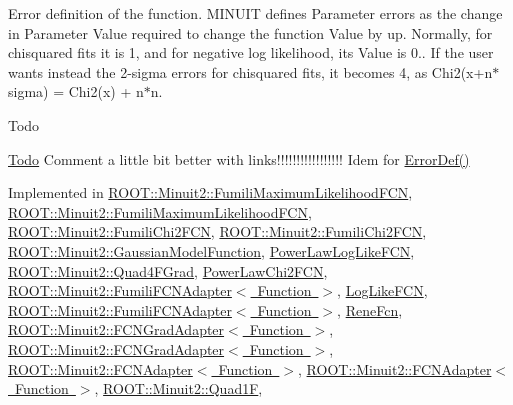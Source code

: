 Error definition of the function. M\+I\+N\+U\+IT defines Parameter errors as the change in Parameter Value required to change the function Value by up. Normally, for chisquared fits it is 1, and for negative log likelihood, its Value is 0.. If the user wants instead the 2-\/sigma errors for chisquared fits, it becomes 4, as Chi2(x+n$\ast$sigma) = Chi2(x) + n$\ast$n.

\begin{DoxyRefDesc}{Todo}
\item[\mbox{\hyperlink{todo__todo000013}{Todo}}]Comment a little bit better with links!!!!!!!!!!!!!!!!! Idem for \mbox{\hyperlink{classROOT_1_1Minuit2_1_1FCNBase_ac4592475c58a65b037ba97ab5f3cba10}{Error\+Def()}}\end{DoxyRefDesc}


Implemented in \mbox{\hyperlink{classROOT_1_1Minuit2_1_1FumiliMaximumLikelihoodFCN_ab945da701895bfba143da08f76ba2d05}{R\+O\+O\+T\+::\+Minuit2\+::\+Fumili\+Maximum\+Likelihood\+F\+CN}}, \mbox{\hyperlink{classROOT_1_1Minuit2_1_1FumiliMaximumLikelihoodFCN_ab945da701895bfba143da08f76ba2d05}{R\+O\+O\+T\+::\+Minuit2\+::\+Fumili\+Maximum\+Likelihood\+F\+CN}}, \mbox{\hyperlink{classROOT_1_1Minuit2_1_1FumiliChi2FCN_a7e68bc2b2eb631ec52b753d7d49c4414}{R\+O\+O\+T\+::\+Minuit2\+::\+Fumili\+Chi2\+F\+CN}}, \mbox{\hyperlink{classROOT_1_1Minuit2_1_1FumiliChi2FCN_a7e68bc2b2eb631ec52b753d7d49c4414}{R\+O\+O\+T\+::\+Minuit2\+::\+Fumili\+Chi2\+F\+CN}}, \mbox{\hyperlink{classROOT_1_1Minuit2_1_1GaussianModelFunction_ae99a5c50055e4563a2252ba8ceb19d20}{R\+O\+O\+T\+::\+Minuit2\+::\+Gaussian\+Model\+Function}}, \mbox{\hyperlink{classPowerLawLogLikeFCN_ae1700e7288ed461d0e3354a2f2c5ea6a}{Power\+Law\+Log\+Like\+F\+CN}}, \mbox{\hyperlink{classROOT_1_1Minuit2_1_1Quad4FGrad_a0c477f97bac7a89bea6bdea9fdae92cf}{R\+O\+O\+T\+::\+Minuit2\+::\+Quad4\+F\+Grad}}, \mbox{\hyperlink{classPowerLawChi2FCN_ad202014937fe0e66dffc0fa9061ca9df}{Power\+Law\+Chi2\+F\+CN}}, \mbox{\hyperlink{classROOT_1_1Minuit2_1_1FumiliFCNAdapter_aeed5b77f0bcca4854a9e6b0620ab3cb9}{R\+O\+O\+T\+::\+Minuit2\+::\+Fumili\+F\+C\+N\+Adapter$<$ Function $>$}}, \mbox{\hyperlink{structLogLikeFCN_ace81f647c3b49597fdfa5a9ff88e56d4}{Log\+Like\+F\+CN}}, \mbox{\hyperlink{classROOT_1_1Minuit2_1_1FumiliFCNAdapter_aeed5b77f0bcca4854a9e6b0620ab3cb9}{R\+O\+O\+T\+::\+Minuit2\+::\+Fumili\+F\+C\+N\+Adapter$<$ Function $>$}}, \mbox{\hyperlink{classReneFcn_a5e7e439a47c37d673d9366918c74239c}{Rene\+Fcn}}, \mbox{\hyperlink{classROOT_1_1Minuit2_1_1FCNGradAdapter_a99e41f07b3f7374c0b17ef42f1c15a19}{R\+O\+O\+T\+::\+Minuit2\+::\+F\+C\+N\+Grad\+Adapter$<$ Function $>$}}, \mbox{\hyperlink{classROOT_1_1Minuit2_1_1FCNGradAdapter_a99e41f07b3f7374c0b17ef42f1c15a19}{R\+O\+O\+T\+::\+Minuit2\+::\+F\+C\+N\+Grad\+Adapter$<$ Function $>$}}, \mbox{\hyperlink{classROOT_1_1Minuit2_1_1FCNAdapter_a3bcb29efda3b97c17bb17512c1629365}{R\+O\+O\+T\+::\+Minuit2\+::\+F\+C\+N\+Adapter$<$ Function $>$}}, \mbox{\hyperlink{classROOT_1_1Minuit2_1_1FCNAdapter_a3bcb29efda3b97c17bb17512c1629365}{R\+O\+O\+T\+::\+Minuit2\+::\+F\+C\+N\+Adapter$<$ Function $>$}}, \mbox{\hyperlink{classROOT_1_1Minuit2_1_1Quad1F_a14469d6031751fa382120df6327da5ee}{R\+O\+O\+T\+::\+Minuit2\+::\+Quad1F}}, 